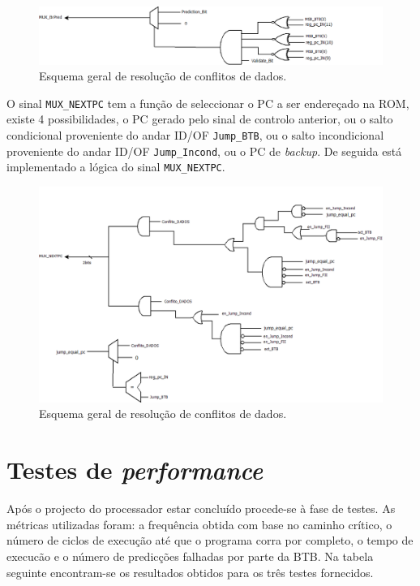 \documentclass[11pt]{article}
\numberwithin{equation}{section}
\begin{document}
\begin{figure}[H]
	\centering
	\includegraphics[keepaspectratio=true, scale=0.27]{imagens/Muxbrprd}
	\vspace{-0.5em}
	\caption{Esquema geral de resolução de conflitos de dados.}
	\vspace{-0.8em}
\end{figure}

O sinal \texttt{MUX\_NEXTPC} tem a função de seleccionar o PC a ser endereçado na ROM, existe 4 possibilidades, o PC gerado pelo sinal de controlo anterior, ou o salto condicional proveniente do andar ID/OF \texttt{Jump\_BTB}, ou o salto incondicional proveniente do andar ID/OF \texttt{Jump\_Incond}, ou o PC de \textit{backup}. De seguida está implementado a lógica do sinal  \texttt{MUX\_NEXTPC}.

\begin{figure}[H]
	\centering
	\includegraphics[keepaspectratio=true, scale=0.27]{imagens/MuxNEXTPC}
	\vspace{-0.5em}
	\caption{Esquema geral de resolução de conflitos de dados.}
	\vspace{-0.8em}
\end{figure}

\section{Testes de \textit{performance}}

Após o projecto do processador estar concluído procede-se à fase de testes. As métricas utilizadas foram: a frequência obtida com base no caminho crítico, o número de ciclos de execução até que o programa corra por completo, o tempo de execucão e o número de predicções falhadas por parte da BTB. Na tabela seguinte encontram-se os resultados obtidos para os três testes fornecidos.
\end{document}

